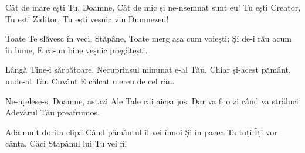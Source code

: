 \beginverse
Cât de mare ești Tu, Doamne,
Cât de mic și ne-nsemnat sunt eu!
Tu ești Creator, Tu ești Ziditor,
Tu ești veșnic viu Dumnezeu!
\endverse

\beginchorus
Toate Te slăvesc în veci, Stăpâne,
Toate merg așa cum voiești;
Și de-i rău acum în lume,
E că-un bine veșnic pregătești.
\endchorus

\beginverse
Lângă Tine-i sărbătoare,
Necuprinsul minunat e-al Tău,
Chiar și-acest pământ, unde-al Tău Cuvânt
E călcat mereu de cel rău.
\endverse

\beginverse
Ne-nțelese-s, Doamne, astăzi
Ale Tale căi aicea jos,
Dar va fi o zi când va străluci
Adevărul Tău preafrumos.
\endverse

\beginverse
Adă mult dorita clipă
Când pământul îl vei înnoi
Și în pacea Ta toți Îți vor cânta,
Căci Stăpânul lui Tu vei fi!
\endverse
\endsong